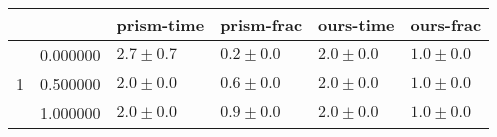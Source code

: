 \begin{tabular}{llllll}
\toprule
 &  & prism-time & prism-frac & ours-time & ours-frac \\
\midrule
\multirow[t]{3}{*}{1} & 0.000000 & $2.7 \pm 0.7$ & $0.2 \pm 0.0$ & $2.0 \pm 0.0$ & $1.0 \pm 0.0$ \\
 & 0.500000 & $2.0 \pm 0.0$ & $0.6 \pm 0.0$ & $2.0 \pm 0.0$ & $1.0 \pm 0.0$ \\
 & 1.000000 & $2.0 \pm 0.0$ & $0.9 \pm 0.0$ & $2.0 \pm 0.0$ & $1.0 \pm 0.0$ \\
\cline{1-6}
\bottomrule
\end{tabular}
